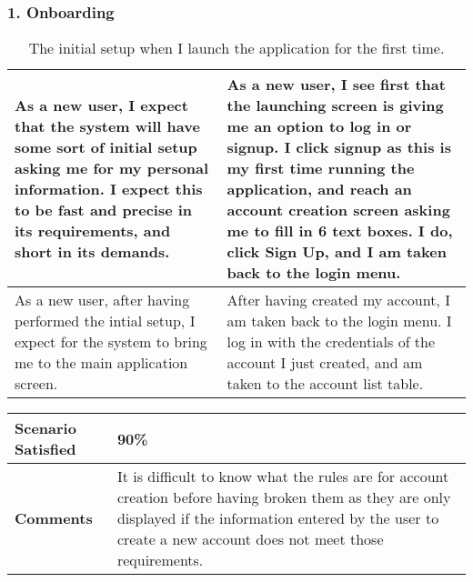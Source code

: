 \subsubsection{1. Onboarding}
\begin{longtable}{|m{7cm}|l|} 
\caption[]{The initial setup when I launch the application for the first time.} 
\\\hline 
\multicolumn{1}{|p{7cm}|}{As a new user, I expect that the system will have some sort of initial setup asking me for my personal information. I expect this to be fast and precise in its requirements, and short in its demands.} & \multicolumn{1}{p{7cm}|}{As a new user, I see first that the launching screen is giving me an option to log in or signup. I click signup as this is my first time running the application, and reach an account creation screen asking me to fill in 6 text boxes. I do, click Sign Up, and I am taken back to the login menu.}\\ \hline
\multicolumn{1}{|p{7cm}|}{As a new user, after having performed the intial setup, I expect for the system to bring me to the main application screen.} & \multicolumn{1}{p{7cm}|}{After having created my account, I am taken back to the login menu. I log in with the credentials of the account I just created, and am taken to the account list table.}\\ \hline
\end{longtable}

\begin{longtable}{|m{4cm}|l|}\hline 
\cellcolor[HTML]{C0C0C0}\textbf{Scenario Satisfied} & \multicolumn{1}{p{13cm}|}{90\%}\\ \hline
\cellcolor[HTML]{C0C0C0}\textbf{Comments} & \multicolumn{1}{p{13cm}|}{It is difficult to know what the rules are for account creation before having broken them as they are only displayed if the information entered by the user to create a new account does not meet those requirements.}\\ \hline
\end{longtable}


